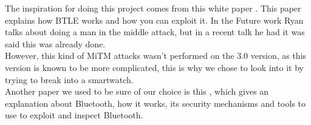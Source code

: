 The inspiration for doing this project comes from this white paper \cite{mryan2014ble}. This paper explains how BTLE works and how you can exploit it. In the Future work Ryan talks about doing a man in the middle attack, but in a recent talk he had \cite{hitbox_mike_ryan} it was said this was already done. \\
However, this kind of MiTM attacks wasn't performed on the 3.0 version, as this version is known to be more complicated, this is why we chose to look into it by trying to break into a smartwatch.\\
Another paper we used to be sure of our choice is this \cite{chai20126}, which gives an explanation about Bluetooth, how it works, its security mechanisms and tools to use to exploit and inspect Bluetooth. 
